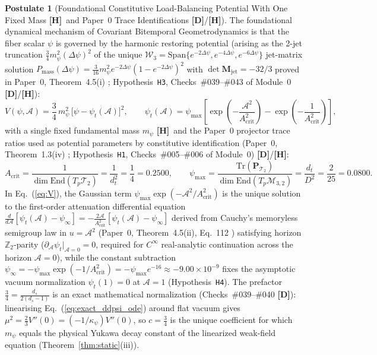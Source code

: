 \documentclass[11pt,a4paper]{article}
\newcommand{\catD}{\textbf{\textcolor{blue!75!black}{[D]}}}
\newcommand{\catH}{\textbf{\textcolor{orange!85!black}{[H]}}}
\theoremstyle{definition}
\newtheorem{postulate}[theorem]{Postulate}
\theoremstyle{remark}
\begin{document}
\begin{postulate}[Foundational Constitutive Load-Balancing Potential With One Fixed Mass \catH\ and Paper~0 Trace Identifications \catD/\catH]
\label{post:potential}
\label{post:margolus_levitin_balancer}
The foundational dynamical mechanism of Covariant Bitemporal Geometrodynamics is that the fiber scalar $\psi$ is governed by the harmonic restoring potential (arising as the 2-jet truncation $\frac{3}{4}m_\psi^2(\Delta\psi)^2$ of the unique $\mathcal{W}_3 = \text{Span}\{e^{-2\Delta\psi}, e^{-4\Delta\psi}, e^{-6\Delta\psi}\}$ jet-matrix solution $P_{\text{mass}}(\Delta\psi) = \frac{3}{16}m_\psi^2 e^{-2\Delta\psi}(1 - e^{-2\Delta\psi})^2$ with $\det\mathbf{M}_{\text{jet}} = -32/3$ proved in Paper~0, Theorem~4.5(i) \cite{JV_Paper0}; Hypothesis~\texttt{H3}, Checks~\#039--\#043 of Module~0 \catD/\catH):
\begin{equation}
  V(\psi, \mathcal{A}) = \frac{3}{4}\,m_\psi^2\,\big[\psi - \psi_t(\mathcal{A})\big]^2,
  \qquad
  \psi_t(\mathcal{A}) = \psi_{\max}\left[\exp\!\left(-\frac{\mathcal{A}^2}{A_{\text{crit}}^2}\right) - \exp\!\left(-\frac{1}{A_{\text{crit}}^2}\right)\right],
  \label{eq:V}
\end{equation}
with a single fixed fundamental mass $m_\psi$ \catH\ and the Paper~0 projector trace ratios used as potential parameters by constitutive identification (Paper~0, Theorem~1.3(iv) \cite{JV_Paper0}; Hypothesis~\texttt{H1}, Checks~\#005--\#006 of Module~0) \catD/\catH:
\begin{equation}
  A_{\text{crit}} = \frac{1}{\dim\text{End}(T_p\mathcal{T}_2)} = \frac{1}{d_t^2} = \frac{1}{4} = \mathbf{0.2500}, \qquad
  \psi_{\max} = \frac{\text{Tr}(\mathbf{P}_{\mathcal{T}_2})}{\dim\text{End}(T_p\mathcal{M}_{3,2})} = \frac{d_t}{D^2} = \frac{2}{25} = \mathbf{0.0800}.
  \label{eq:constitutive_acrit_psimax}
\end{equation}
In Eq.~(\ref{eq:V}), the Gaussian term $\psi_{\max}\exp(-\mathcal{A}^2/A_{\text{crit}}^2)$ is the unique solution to the first-order attenuation differential equation $\frac{d}{d\mathcal{A}}[\psi_t(\mathcal{A}) - \psi_\infty] = -\frac{2\mathcal{A}}{A_{\text{crit}}^2}[\psi_t(\mathcal{A}) - \psi_\infty]$ derived from Cauchy's memoryless semigroup law in $u = \mathcal{A}^2$ (Paper~0, Theorem~4.5(ii), Eq.~112 \cite{JV_Paper0}) satisfying horizon $\mathbb{Z}_2$-parity ($\partial_{\mathcal{A}}\psi_t|_{\mathcal{A}=0} = 0$, required for $C^\infty$ real-analytic continuation across the horizon $\mathcal{A} = 0$), while the constant subtraction $\psi_\infty = -\psi_{\max}\exp(-1/A_{\text{crit}}^2) = -\psi_{\max}e^{-16} \approx -9.00 \times 10^{-9}$ fixes the asymptotic vacuum normalization $\psi_t(1) = 0$ at $\mathcal{A} = 1$ (Hypothesis~\texttt{H4}). The prefactor $\frac{3}{4} = \frac{d_s}{2(d_s - 1)}$ is an exact mathematical normalization (Checks~\#039--\#040 \catD): linearising Eq.~(\ref{eq:exact_ddpsi_ode}) around flat vacuum gives $\mu^2 = \frac{2}{3}V''(0) = (-1/\kappa_\psi)V''(0)$, so $c = \frac{3}{4}$ is the unique coefficient for which $m_\psi$ equals the physical Yukawa decay constant of the linearized weak-field equation (Theorem~\ref{thm:static}(iii)).
\end{postulate}
\end{document}
